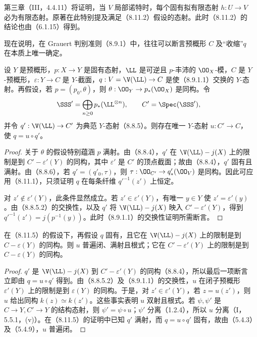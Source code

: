  第三章（III，4.4.11）将证明，当 $V$ 局部诺特时，每个固有拟有限态射 $h:U\to V$ 必为有限态射。原著在此特别提及满足（8.11.2）假设的态射。此时（8.11.2）的结论也由（6.1.15）得到。

 现在说明，在 Grauert 判别准则（8.9.1）中，往往可以断言预概形 $C$ 及“收缩”$q$ 在本质上唯一确定。

 设 $Y$ 是预概形，$p:X\to Y$ 是固有态射，$\LL$ 是可逆且 $p$-丰沛的 $\OO_X$-模，$C$ 是 $Y$-预概形，$\varepsilon:Y\to C$ 是 $Y$-截面，$q:V=\V(\LL)\to C$ 是使（8.9.1.1）交换的 $Y$-态射。再假设，若 $p=(p_0,\theta)$，则 $\theta:\OO_Y\to p_*(\OO_X)$ 是同构。令
\[\SSS'=\bigoplus_{n\geq0}p_*(\LL^{\otimes n}),\qquad C'=\Spec(\SSS'),\]
并令 $q':\V(\LL)\to C'$ 为典范 $Y$-态射（8.8.5）。则存在唯一 $Y$-态射 $u:C'\to C$，使 $q=u\circ q'$。
\begin{proof}
关于 $\theta$ 的假设特别蕴涵 $p$ 满射。由（8.8.4），$q'$ 在 $\V(\LL)-j(X)$ 上的限制是到 $C'-\varepsilon'(Y)$ 的同构，其中 $\varepsilon'$ 是 $C'$ 的顶点截面；故由（8.8.4），$q'$ 固有且满射。由（8.8.6），若 $q'=(q'_0,\tau)$，则 $\tau:\OO_{C'}\to q'_*(\OO_V)$ 是同构。因此可应用（8.11.1），只须证明 $q$ 在每条纤维 $q'^{-1}(z')$ 上恒定。

对 $z'\notin\varepsilon'(Y)$，此条件显然成立。若 $z'\in\varepsilon'(Y)$，有唯一 $y\in Y$ 使 $z'=\varepsilon'(y)$。由（8.8.5.2）的交换性，以及 $q'$ 将 $\V(\LL)-j(X)$ 映入 $C'-\varepsilon'(Y)$，得到 $q'^{-1}(z')=j(p^{-1}(y))$。此时（8.9.1.1）的交换性证明所需断言。
\end{proof}

 在（8.11.5）的假设下，再假设 $q$ 固有，且它在 $\V(\LL)-j(X)$ 上的限制是到 $C-\varepsilon(Y)$ 的同构。则 $u$ 普遍闭、满射且根式；它在 $C'-\varepsilon'(Y)$ 上的限制是到 $C-\varepsilon(Y)$ 的同构。
\begin{proof}
$q'$ 是 $\V(\LL)-j(X)$ 到 $C'-\varepsilon'(Y)$ 的同构（8.8.4），所以最后一项断言立即由 $q=u\circ q'$ 得到。由（8.8.5.2）及（8.9.1.1）的交换性，$u$ 在闭子预概形 $\varepsilon'(Y)$ 上的限制是到 $\varepsilon(Y)$ 的同构。于是，对 $z'\in\varepsilon'(Y)$，若 $z=u(z')$，则 $u$ 给出同构 $k(z)\simeq k(z')$。这些事实表明 $u$ 双射且根式。若 $\psi,\psi'$ 是 $C\to Y,C'\to Y$ 的结构态射，则 $\psi'=\psi\circ u$；$\psi'$ 分离（1.2.4），所以 $u$ 分离（I，5.5.1，(v)）。在（8.11.5）的证明中已知 $q'$ 满射，而 $q=u\circ q'$ 固有，故由（5.4.3）及（5.4.9），$u$ 普遍闭。
\end{proof}

